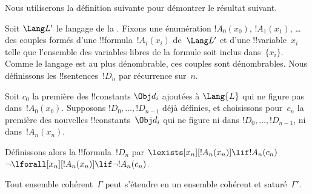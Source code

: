 \documentclass[../../../include/open-logic-section]{subfiles}
\begin{document}
Nous utiliserons la définition suivante pour démontrer le résultat
suivant.

\begin{defn}
Soit $\Lang L'$ le langage de la . Fixons une
énumération $!A_0(x_0)$, $!A_1(x_1)$, \dots des couples formés
d'une !!{formula}~$!A_i(x_i)$ de~$\Lang L'$ et d'une
!!{variable}~$x_i$ telle que l'ensemble des variables libres de
la formule soit inclus dans~$\{x_i\}$. Comme le langage est au plus dénombrable,
ces couples sont dénombrables. Nous définissons les
!!{sentence}s~$!D_n$ par récurrence sur~$n$.

Soit $c_0$ la première des !!{constant}s $\Obj d_i$ ajoutées à
$\Lang{L}$ qui ne figure pas dans~$!A_0(x_0)$. Supposons
$!D_0,\dots,!D_{n-1}$ déjà définies, et choisissons pour~$c_n$
la première des nouvelles !!{constant}s~$\Obj d_i$ qui ne figure
ni dans $!D_0,\dots,!D_{n-1}$, ni dans~$!A_n(x_n)$.

Définissons alors la !!{formula}~$!D_n$ par
{$\lexists[x_{n}][!A_{n}(x_{n})] \lif
  !A_{n}(c_{n})$}{$\lnot\lforall[x_{n}][!A_{n}(x_{n})] \lif \lnot
  !A_{n}(c_{n})$}.
\end{defn}

\begin{lem}
Tout ensemble cohérent~$\Gamma$ peut s'étendre en un ensemble
cohérent et saturé~$\Gamma'$.
\end{lem}
\end{document}
